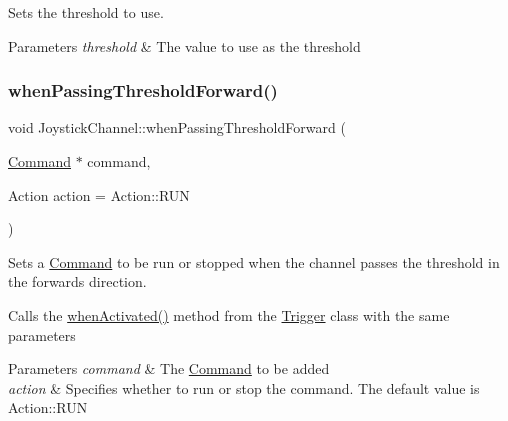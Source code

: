 Sets the threshold to use. 


\begin{DoxyParams}{Parameters}
{\em threshold} & The value to use as the threshold \\
\hline
\end{DoxyParams}
\mbox{\label{classlib_iterative_robot_1_1_joystick_channel_abd2ccc1b4789ef1896f8b49192ef2ecd}} 
\subsubsection{\texorpdfstring{whenPassingThresholdForward()}{whenPassingThresholdForward()}}
{\footnotesize\ttfamily void Joystick\+Channel\+::when\+Passing\+Threshold\+Forward (\begin{DoxyParamCaption}\item[{\mbox{\hyperlink{classlib_iterative_robot_1_1_command}{Command}} $\ast$}]{command,  }\item[{Action}]{action = {\ttfamily Action\+:\+:RUN} }\end{DoxyParamCaption})}



Sets a \mbox{\hyperlink{classlib_iterative_robot_1_1_command}{Command}} to be run or stopped when the channel passes the threshold in the forwards direction. 

Calls the \mbox{\hyperlink{classlib_iterative_robot_1_1_trigger_a1e98ebb42428b05ccab7dda82b9e58dc}{when\+Activated()}} method from the \mbox{\hyperlink{classlib_iterative_robot_1_1_trigger}{Trigger}} class with the same parameters


\begin{DoxyParams}{Parameters}
{\em command} & The \mbox{\hyperlink{classlib_iterative_robot_1_1_command}{Command}} to be added \\
\hline
{\em action} & Specifies whether to run or stop the command. The default value is Action\+::\+R\+UN \\
\hline
\end{DoxyParams}
\mbox{\label{classlib_iterative_robot_1_1_joystick_channel_a6b90ec0fdbca27aee324ff9d71e93a94}} 
